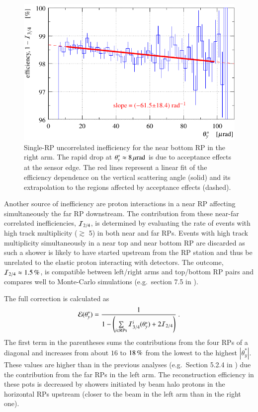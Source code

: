 \begin{figure}
\begin{center}
\includegraphics{fig/eff3outof4_fits.pdf}
\caption{%
Single-RP uncorrelated inefficiency for the near bottom RP in the right arm. The rapid drop at $\theta_y^* \approx 8\,{\rm \mu rad}$ is due to acceptance effects at the sensor edge. The red lines represent a linear fit of the efficiency dependence on the vertical scattering angle (solid) and its extrapolation to the regions affected by acceptance effects (dashed).
}
\label{fig:eff 3/4}
\end{center}
\end{figure}

Another source of inefficiency are proton interactions in a near RP affecting simultaneously the far RP downstream. The contribution from these near-far correlated inefficiencies, ${\cal I}_{2/4}$, is determined by evaluating the rate of events with high track multiplicity ($\gtrsim$ 5) in both near and far RPs. Events with high track multiplicity simultaneously in a near top and near bottom RP are discarded as such a shower is likely to have started upstream from the RP station and thus be unrelated to the elastic proton interacting with detectors. The outcome, ${\cal I}_{2/4} \approx 1.5\un{\%}$, is compatible between left/right arms and top/bottom RP pairs and compares well to Monte-Carlo simulations (e.g.~section 7.5 in \cite{hubert-thesis}).

The full correction is calculated as
\begin{equation}
\label{efficiency}
	{\cal E}(\theta_y^*) = {1\over 1 - \left( \sum\limits_{i\in \rm RPs} {\cal I}^i_{3/4}(\theta_y^*) + 2 {\cal I}_{2/4} \right) } \ .
\end{equation}
The first term in the parentheses sums the contributions from the four RPs of a diagonal and increases from about $16$ to $18\,{\rm \%}$ from the lowest to the highest $|\theta_y^*|$. These values are higher than in the previous analyses (e.g.~Section 5.2.4 in \cite{8tev-90m}) due the contribution from the far RPs in the left arm. The reconstruction efficiency in these pots is decreased by showers initiated by beam halo protons in the horizontal RPs upstream (closer to the beam in the left arm than in the right one).

